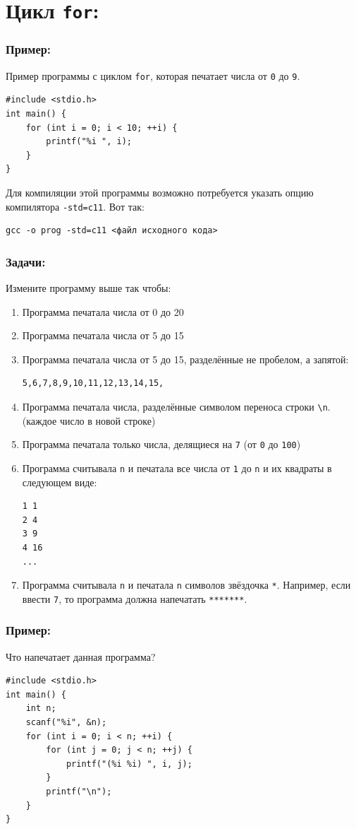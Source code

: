 \documentclass{article}
\begin{document}
\section*{Цикл \texttt{for}:}
\subsubsection*{Пример:}
Пример программы с циклом \texttt{for}, которая печатает числа от \texttt{0} до \texttt{9}.
\begin{lstlisting}
#include <stdio.h>
int main() {
    for (int i = 0; i < 10; ++i) {
        printf("%i ", i);
    }
}
\end{lstlisting}
Для компиляции этой программы возможно потребуется указать опцию компилятора \texttt{-std=c11}. Вот так:
\begin{verbatim}
gcc -o prog -std=c11 <файл исходного кода>
\end{verbatim}

\subsubsection*{Задачи:}
Измените программу выше так чтобы:
\begin{enumerate}
\item Программа печатала числа от 0 до 20
\item Программа печатала числа от 5 до 15
\item Программа печатала числа от 5 до 15, разделённые не пробелом, а запятой:
\begin{verbatim}
5,6,7,8,9,10,11,12,13,14,15,
\end{verbatim}
\item Программа печатала числа, разделённые символом переноса строки \texttt{\textbackslash n}. (каждое число в новой строке)
\item Программа печатала только числа, делящиеся на \texttt{7}  (от \texttt{0} до \texttt{100})
\item Программа считывала \texttt{n} и печатала все числа от \texttt{1} до \texttt{n} и их квадраты в следующем виде:
\begin{verbatim}
1 1
2 4
3 9
4 16
...
\end{verbatim}
\item Программа считывала \texttt{n} и печатала \texttt{n} символов звёздочка \texttt{*}. Например, если ввести \texttt{7}, то программа должна напечатать \texttt{*******}.
\end{enumerate}

\subsubsection*{Пример:}
Что напечатает данная программа?
\begin{lstlisting}
#include <stdio.h>
int main() {
    int n;
    scanf("%i", &n);
    for (int i = 0; i < n; ++i) {
        for (int j = 0; j < n; ++j) {
            printf("(%i %i) ", i, j);
        }
        printf("\n");
    }
}
\end{lstlisting}
\end{document}
